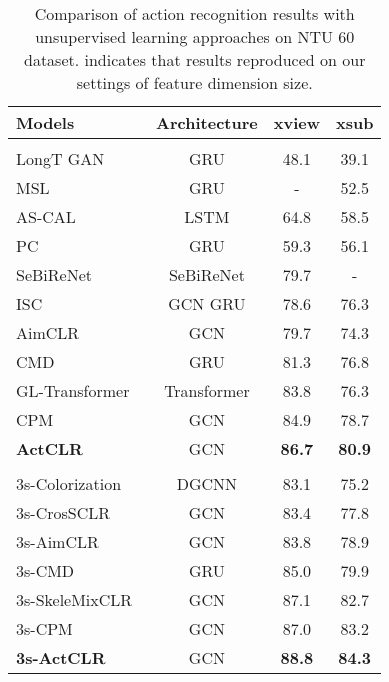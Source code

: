 \documentclass[twocolumn]{article}
\begin{document}
\begin{table}[tb]
    \small
    \centering
    \caption{Comparison of action recognition results with unsupervised learning approaches on NTU 60 dataset.  indicates that results reproduced on our settings of feature dimension size.}
    \begin{tabular}{l|c|c|c}
      \toprule
Models&Architecture&xview&xsub\\
      \midrule
      \rowcolor{gray!10} \multicolumn{4}{l}{\textit{Single-stream:}}\\
      LongT GAN~\cite{zheng2018unsupervised} & GRU & 48.1 & 39.1\\
      MSL~\cite{lin2020ms2l} & GRU & - & 52.5\\
      AS-CAL~\cite{rao2021augmented} & LSTM & 64.8 & 58.5 \\
      PC~\cite{su2020predict} & GRU & 59.3 & 56.1 \\
      SeBiReNet~\cite{nie2020unsupervised} & SeBiReNet & 79.7 & -\\
      ISC~\cite{thoker2021skeleton}& GCN  GRU & 78.6 & 76.3 \\
      AimCLR~\cite{guo2021contrastive}& GCN & 79.7 & 74.3\\
      CMD~\cite{mao2022cmd} & GRU & 81.3 & 76.8 \\
      GL-Transformer~\cite{kim2022global} & Transformer & 83.8 & 76.3\\
      CPM~\cite{zhang2022contrastive} & GCN & 84.9 & 78.7\\
      \textbf{ActCLR} & GCN & \textbf{86.7} &\textbf{80.9}\\
      \midrule
      \rowcolor{gray!10} \multicolumn{4}{l}{\textit{Three-stream:}}\\
      3s-Colorization~\cite{yang2021skeleton} & DGCNN & 83.1 & 75.2 \\
      3s-CrosSCLR~\cite{li20213d} & GCN & 83.4 & 77.8\\
      3s-AimCLR~\cite{guo2021contrastive}& GCN & 83.8 & 78.9\\
      3s-CMD~\cite{mao2022cmd} & GRU & 85.0 & 79.9 \\
      3s-SkeleMixCLR~\cite{chen2022contrastive} & GCN & 87.1 & 82.7\\
      3s-CPM~\cite{zhang2022contrastive} & GCN & 87.0 & 83.2\\
      \textbf{3s-ActCLR} & GCN & \textbf{88.8} &\textbf{84.3}\\
      \bottomrule
    \end{tabular}
    \label{tab:unsupervised_ntu_60}
  \end{table}
  
\end{document}
